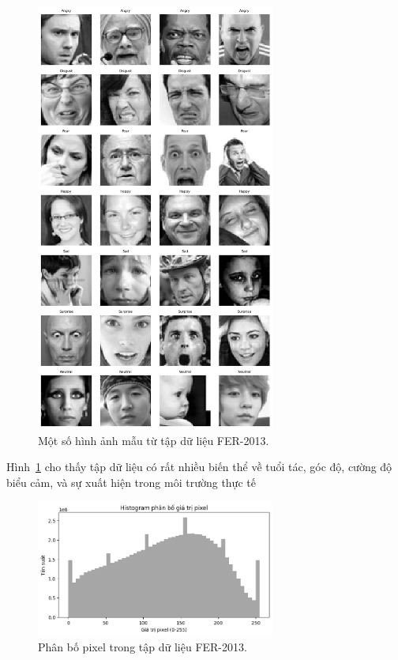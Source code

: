\begin{figure}[H]
    \centering
    \includegraphics[width=0.7\textwidth]{img/truc_quan_anh_mau.png} %
    \caption{Một số hình ảnh mẫu từ tập dữ liệu FER-2013.}
    \label{fig:sample_images}
\end{figure}
Hình~\ref{fig:sample_images} cho thấy tập dữ liệu có rất nhiều biến thể về tuổi tác, góc độ, cường độ
biểu cảm, và sự xuất hiện trong môi trường thực tế
\begin{figure}[H]
    \centering
    \includegraphics[width=0.7\textwidth]{img/phan_bo_pixel.png} %
    \caption{Phân bố pixel trong tập dữ liệu FER-2013.}
    \label{fig:pixel_distribution}
\end{figure}

